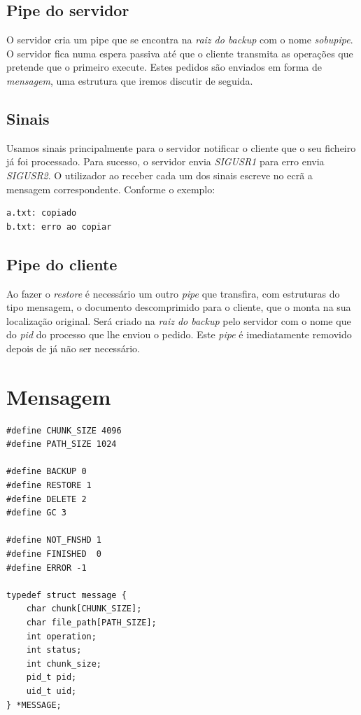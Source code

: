 \documentclass[12pt,a4paper]{report}
\begin{document}
\section{Pipe do servidor}
O servidor cria um pipe que se encontra na \emph{raiz do backup} com o nome \emph{sobupipe}. O servidor fica numa espera passiva até que o cliente transmita as operações que pretende que o primeiro execute. Estes pedidos são enviados em forma de \emph{mensagem}, uma estrutura que iremos discutir de seguida.

\section{Sinais}
Usamos sinais principalmente para o servidor notificar o cliente que o seu ficheiro já foi processado. Para sucesso, o servidor envia \emph{SIGUSR1} para erro envia \emph{SIGUSR2}. O utilizador ao receber cada um dos sinais escreve no ecrã a mensagem correspondente. Conforme o exemplo:
\begin{lstlisting}
a.txt: copiado
b.txt: erro ao copiar
\end{lstlisting}

\section{Pipe do cliente}
Ao fazer o \emph{restore} é necessário um outro \emph{pipe} que transfira, com estruturas do tipo mensagem, o documento descomprimido para o cliente, que o monta na sua localização original. Será criado na \emph{raiz do backup} pelo servidor com o nome que do \emph{pid} do processo que lhe enviou o pedido. Este \emph{pipe} é imediatamente removido depois de já não ser necessário.  

\chapter{Mensagem}

\begin{lstlisting}
#define CHUNK_SIZE 4096
#define PATH_SIZE 1024

#define BACKUP 0
#define RESTORE 1
#define DELETE 2
#define GC 3

#define NOT_FNSHD 1
#define FINISHED  0 
#define ERROR -1

typedef struct message {
    char chunk[CHUNK_SIZE];
    char file_path[PATH_SIZE];
    int operation;
    int status;
    int chunk_size;
    pid_t pid;
    uid_t uid;
} *MESSAGE;
\end{lstlisting}
\end{document}
